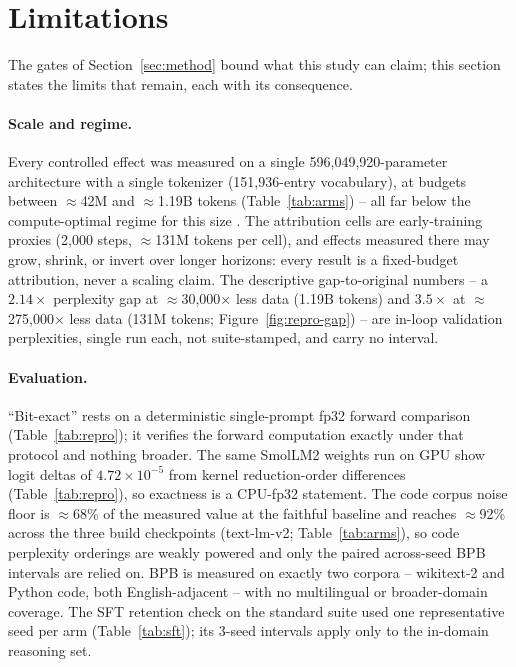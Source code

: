 \section{Limitations}\label{sec:limitations}

The gates of Section~\ref{sec:method} bound what this study can claim; this section states the limits that remain, each with its consequence.

\paragraph{Scale and regime.}
Every controlled effect was measured on a single 596{,}049{,}920-parameter architecture with a single tokenizer (151{,}936-entry vocabulary), at budgets between $\approx$42M and $\approx$1.19B tokens (Table~\ref{tab:arms}) -- all far below the compute-optimal regime for this size \citep{hoffmann2022training}. The attribution cells are early-training proxies (2{,}000 steps, $\approx$131M tokens per cell), and effects measured there may grow, shrink, or invert over longer horizons: every result is a fixed-budget attribution, never a scaling claim. The descriptive gap-to-original numbers -- a $2.14\times$ perplexity gap at $\approx$30{,}000$\times$ less data (1.19B tokens) and $3.5\times$ at $\approx$275{,}000$\times$ less data (131M tokens; Figure~\ref{fig:repro-gap}) -- are in-loop validation perplexities, single run each, not suite-stamped, and carry no interval.

\paragraph{Evaluation.}
``Bit-exact'' rests on a deterministic single-prompt fp32 forward comparison (Table~\ref{tab:repro}); it verifies the forward computation exactly under that protocol and nothing broader. The same SmolLM2 weights run on GPU show logit deltas of $4.72\times10^{-5}$ from kernel reduction-order differences (Table~\ref{tab:repro}), so exactness is a CPU-fp32 statement. The code corpus noise floor is $\approx$68\% of the measured value at the faithful baseline and reaches $\approx$92\% across the three build checkpoints (text-lm-v2; Table~\ref{tab:arms}), so code perplexity orderings are weakly powered and only the paired across-seed BPB intervals are relied on. BPB is measured on exactly two corpora -- wikitext-2 and Python code, both English-adjacent -- with no multilingual or broader-domain coverage. The SFT retention check on the standard suite used one representative seed per arm (Table~\ref{tab:sft}); its 3-seed intervals apply only to the in-domain reasoning set.

